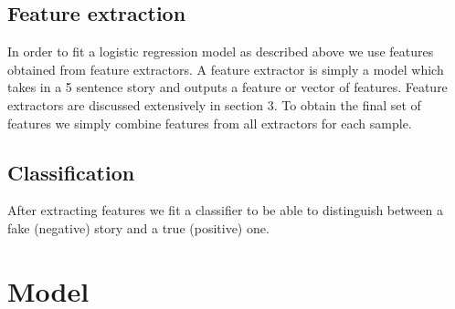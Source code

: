 \documentclass{article}
\begin{document}
\subsection{Feature extraction}
In order to fit a logistic regression model as described above we use features obtained from feature extractors. A feature extractor is simply a model which takes in a 5 sentence story and outputs a feature or vector of features. Feature extractors are discussed extensively in section 3. To obtain the final set of features we simply combine features from all extractors for each sample.

\subsection{Classification}
After extracting features we fit a classifier to be able to distinguish between a fake (negative) story and a true (positive) one.

\section{Model}
\end{document}
